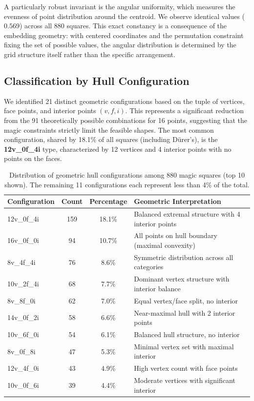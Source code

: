 A particularly robust invariant is the angular uniformity, which measures the evenness of point distribution around the centroid. We observe identical values ($0.569$) across all 880 squares. This exact constancy is a consequence of the embedding geometry: with centered coordinates and the permutation constraint fixing the set of possible values, the angular distribution is determined by the grid structure itself rather than the specific arrangement.

\subsection{Classification by Hull Configuration}

We identified 21 distinct geometric configurations based on the tuple of vertices, face points, and interior points $(v, f, i)$. This represents a significant reduction from the 91 theoretically possible combinations for 16 points, suggesting that the magic constraints strictly limit the feasible shapes. The most common configuration, shared by 18.1\% of all squares (including Dürer's), is the \textbf{12v\_0f\_4i} type, characterized by 12 vertices and 4 interior points with no points on the faces.

\begin{table}[h]
\centering
\begin{tabular}{lccp{5cm}}
\toprule
Configuration & Count & Percentage & Geometric Interpretation \\
\midrule
12v\_0f\_4i & 159 & 18.1\% & Balanced extremal structure with 4 interior points \\
16v\_0f\_0i & 94 & 10.7\% & All points on hull boundary (maximal convexity) \\
8v\_4f\_4i & 76 & 8.6\% & Symmetric distribution across all categories \\
10v\_2f\_4i & 68 & 7.7\% & Dominant vertex structure with interior balance \\
8v\_8f\_0i & 62 & 7.0\% & Equal vertex/face split, no interior \\
14v\_0f\_2i & 58 & 6.6\% & Near-maximal hull with 2 interior points \\
10v\_6f\_0i & 54 & 6.1\% & Balanced hull structure, no interior \\
8v\_0f\_8i & 47 & 5.3\% & Minimal vertex set with maximal interior \\
12v\_4f\_0i & 43 & 4.9\% & High vertex count with face points \\
10v\_0f\_6i & 39 & 4.4\% & Moderate vertices with significant interior \\
\bottomrule
\end{tabular}
\caption{Distribution of geometric hull configurations among 880 magic squares (top 10 shown). The remaining 11 configurations each represent less than 4\% of the total.}
\label{tab:geom-classification}
\end{table}

